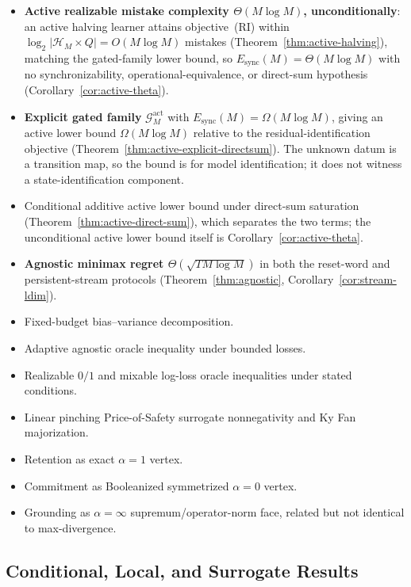 \documentclass[12pt]{article}
\theoremstyle{definition}
\newcommand{\Esync}{E_{\mathrm{sync}}}
\newcommand{\Gact}{\mathcal G^{\mathrm{act}}}
\begin{document}
\begin{itemize}[leftmargin=1.6em]
(Proposition~\ref{prop:active-length-upper}).
\item \textbf{Active realizable mistake complexity
$\Theta(M\log M)$, unconditionally}: an active halving learner attains
objective~(RI) within $\log_2|\mathcal H_M\times Q|=O(M\log M)$ mistakes
(Theorem~\ref{thm:active-halving}), matching the gated-family lower bound, so
$\Esync(M)=\Theta(M\log M)$ with no synchronizability,
operational-equivalence, or direct-sum hypothesis
(Corollary~\ref{cor:active-theta}).
\item \textbf{Explicit gated family} $\Gact_M$ with
$\Esync(M)=\Omega(M\log M)$, giving an active lower bound
$\Omega(M\log M)$ relative to the residual-identification objective
(Theorem~\ref{thm:active-explicit-directsum}).  The unknown datum is a
transition map, so the bound is for model identification; it does not witness a
state-identification component.
\item Conditional additive active lower bound under direct-sum saturation
(Theorem~\ref{thm:active-direct-sum}), which separates the two terms; the
unconditional active lower bound itself is
Corollary~\ref{cor:active-theta}.
\item \textbf{Agnostic minimax regret $\Theta(\sqrt{T M\log M})$} in both the
reset-word and persistent-stream protocols
(Theorem~\ref{thm:agnostic}, Corollary~\ref{cor:stream-ldim}).
\item Fixed-budget bias--variance decomposition.
\item Adaptive agnostic oracle inequality under bounded losses.
\item Realizable $0/1$ and mixable log-loss oracle inequalities under stated
conditions.
\item Linear pinching Price-of-Safety surrogate nonnegativity and Ky Fan
majorization.
\item Retention as exact $\alpha=1$ vertex.
\item Commitment as Booleanized symmetrized $\alpha=0$ vertex.
\item Grounding as $\alpha=\infty$ supremum/operator-norm face, related but
not identical to max-divergence.
\end{itemize}

\subsection{Conditional, Local, and Surrogate Results}
\label{subsec:conditional-results}
\end{document}
